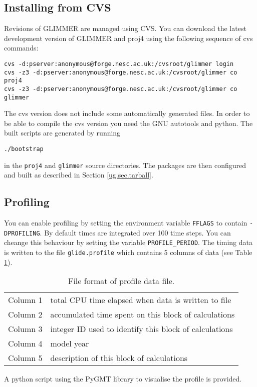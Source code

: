 \subsection{Installing from CVS}
Revisions of GLIMMER are managed using CVS. You can download the latest development version of GLIMMER and proj4 using the following sequence of cvs commands:
\begin{verbatim}
cvs -d:pserver:anonymous@forge.nesc.ac.uk:/cvsroot/glimmer login
cvs -z3 -d:pserver:anonymous@forge.nesc.ac.uk:/cvsroot/glimmer co proj4
cvs -z3 -d:pserver:anonymous@forge.nesc.ac.uk:/cvsroot/glimmer co glimmer
\end{verbatim}

The cvs version does not include some automatically generated files. In order to be able to compile the cvs version you need the GNU autotools and python. The built scripts are generated by running
\begin{verbatim}
./bootstrap
\end{verbatim}
in the \texttt{proj4} and \texttt{glimmer} source directories. The packages are then configured and built as described in Section \ref{ug.sec.tarball}.


\subsection{Profiling}\label{ug.sec.profile}
You can enable profiling by setting the environment variable \texttt{FFLAGS} to contain \texttt{-DPROFILING}. By default times are integrated over 100 time steps. You can cheange this behaviour by setting the variable \texttt{PROFILE\_PERIOD}. The timing data is written to the file \texttt{glide.profile} which contains 5 columns of data (see Table \ref{ug.tab.profile_format}).
\begin{table}[htbp]
  \centering
  \begin{tabular}{|l|l|}
    \hline
    Column 1 &total CPU time elapsed when data is written to file\\
    Column 2 &accumulated time spent on this block of calculations\\
    Column 3 &integer ID used to identify this block of calculations\\
    Column 4 &model year\\
    Column 5 &description of this block of calculations\\
    \hline
  \end{tabular}
  \caption{File format of profile data file.}
  \label{ug.tab.profile_format}
\end{table}
A python script using the PyGMT library to visualise the profile is provided.

